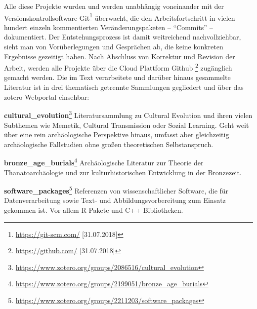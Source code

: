 \documentclass[openany,twoside,twocolumn]{book}
\let\rmarkdownfootnote\footnote%
\def\footnote{\protect\rmarkdownfootnote}
\begin{document}
Alle diese Projekte wurden und werden unabhängig voneinander mit der
Versionskontrollsoftware Git\footnote{\url{https://git-scm.com/}
  {[}31.07.2018{]}} überwacht, die den Arbeitsfortschritt in vielen
hundert einzeln kommentierten Veränderungspaketen -- ``Commits'' --
dokumentiert. Der Entstehungsprozess ist damit weitreichend
nachvollziehbar, sieht man von Vorüberlegungen und Gesprächen ab, die
keine konkreten Ergebnisse gezeitigt haben. Nach Abschluss von Korrektur
und Revision der Arbeit, werden alle Projekte über die Cloud Plattform
Github \footnote{\url{https://github.com/} {[}31.07.2018{]}} zugänglich
gemacht werden. Die im Text verarbeitete und darüber hinaus gesammelte
Literatur ist in drei thematisch getrennte Sammlungen gegliedert und
über das zotero Webportal einsehbar:

\textbf{cultural\_evolution}\footnote{\url{https://www.zotero.org/groups/2086516/cultural_evolution}}
Literatursammlung zu Cultural Evolution und ihren vielen Subthemen wie
Memetik, Cultural Transmission oder Sozial Learning. Geht weit über eine
rein archäologische Perspektive hinaus, umfasst aber gleichzeitig
archäologische Fallstudien ohne großen theoretischen Selbstanspruch.

\textbf{bronze\_age\_burials}\footnote{\url{https://www.zotero.org/groups/2199051/bronze_age_burials}}
Archäologische Literatur zur Theorie der Thanatoarchäologie und zur
kulturhistorischen Entwicklung in der Bronzezeit.

\textbf{software\_packages}\footnote{\url{https://www.zotero.org/groups/2211203/software_packages}}
Referenzen von wissenschaftlicher Software, die für Datenverarbeitung
sowie Text- und Abbildungsvorbereitung zum Einsatz gekommen ist. Vor
allem R Pakete und C++ Bibliotheken.
\end{document}
